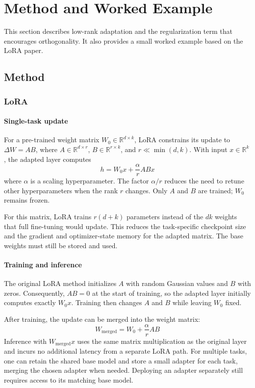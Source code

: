 \section{Method and Worked Example}
This section describes low-rank adaptation and the regularization term that encourages orthogonality. It also provides a small worked example based on the LoRA paper.

\subsection{Method}

\subsubsection{LoRA}

\paragraph{Single-task update}

For a pre-trained weight matrix \(W_0\in\mathbb{R}^{d\times k}\), LoRA \cite{hu2022lora} constrains its update to \(\Delta W=AB\), where \(A\in\mathbb{R}^{d\times r}\), \(B\in\mathbb{R}^{r\times k}\), and \(r\ll\min(d,k)\). With input \(x\in\mathbb{R}^{k}\), the adapted layer computes
\[
	h=W_0x+\frac{\alpha}{r}ABx
\]
where \(\alpha\) is a scaling hyperparameter.
The factor \(\alpha/r\) reduces the need to retune other hyperparameters when the rank \(r\) changes.
Only \(A\) and \(B\) are trained; \(W_0\) remains frozen.

For this matrix, LoRA trains \(r(d+k)\) parameters instead of the \(dk\) weights that full fine-tuning would update. This reduces the task-specific checkpoint size and the gradient and optimizer-state memory for the adapted matrix. The base weights must still be stored and used.


\paragraph{Training and inference}

The original LoRA method initializes \(A\) with random Gaussian values and \(B\) with zeros. Consequently, \(AB=0\) at the start of training, so the adapted layer initially computes exactly \(W_0x\). Training then changes \(A\) and \(B\) while leaving \(W_0\) fixed.

After training, the update can be merged into the weight matrix:
\[
	W_{\mathrm{merged}}=W_0+\frac{\alpha}{r}AB
\]
Inference with \(W_{\mathrm{merged}}x\) uses the same matrix multiplication as the original layer and incurs no additional latency from a separate LoRA path. For multiple tasks, one can retain the shared base model and store a small adapter for each task, merging the chosen adapter when needed. Deploying an adapter separately still requires access to its matching base model.

